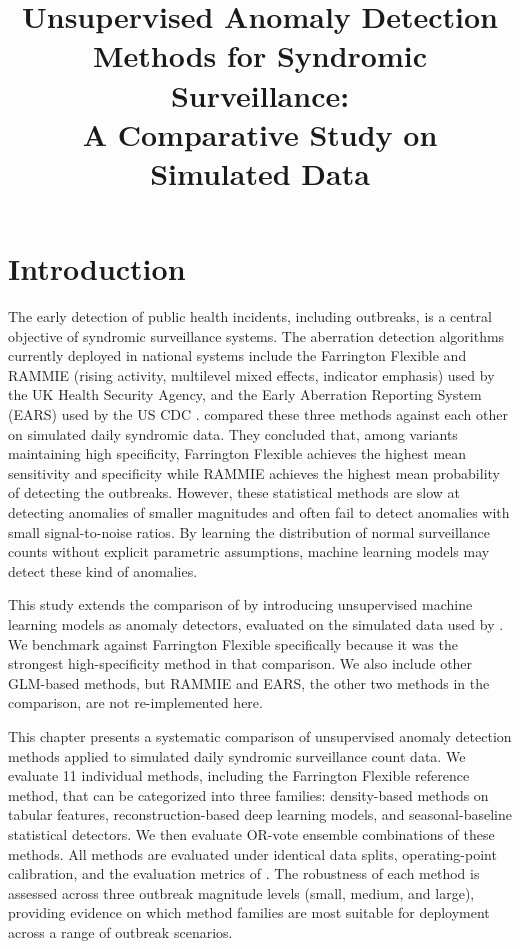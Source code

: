 \documentclass[11pt]{article}
\title{Unsupervised Anomaly Detection Methods for Syndromic Surveillance:\\
A Comparative Study on Simulated Data}
\author{}
\date{}
\begin{document}
\maketitle

\section{Introduction}

The early detection of public health incidents, including outbreaks, is a central objective of syndromic surveillance systems. The aberration detection algorithms currently deployed in national systems include the Farrington Flexible \citep{noufaily2013} and RAMMIE (rising activity, multilevel mixed effects, indicator emphasis) used by the UK Health Security Agency, and the Early Aberration Reporting System (EARS) used by the US CDC \citep{hutwagner2003, noufaily2013, morbey2015}. \citet{noufaily2019} compared these three methods against each other on simulated daily syndromic data. They concluded that, among variants maintaining high specificity, Farrington Flexible achieves the highest mean sensitivity and specificity while RAMMIE achieves the highest mean probability of detecting the outbreaks. However, these statistical methods are slow at detecting anomalies of smaller magnitudes and often fail to detect anomalies with small signal-to-noise ratios. By learning the distribution of normal surveillance counts without explicit parametric assumptions, machine learning models may detect these kind of anomalies.

This study extends the comparison of \citet{noufaily2019} by introducing unsupervised machine learning models as anomaly detectors, evaluated on the simulated data used by \citet{noufaily2019}. We benchmark against Farrington Flexible specifically because it was the strongest high-specificity method in that comparison. We also include other GLM-based methods, but RAMMIE and EARS, the other two methods in the \citet{noufaily2019} comparison, are not re-implemented here.

This chapter presents a systematic comparison of unsupervised anomaly detection methods applied to simulated daily syndromic surveillance count data. We evaluate 11 individual methods, including the Farrington Flexible reference method, that can be categorized into three families: density-based methods on tabular features, reconstruction-based deep learning models, and seasonal-baseline statistical detectors. We then evaluate OR-vote ensemble combinations of these methods. All methods are evaluated under identical data splits, operating-point calibration, and the evaluation metrics of \citet{noufaily2019}. The robustness of each method is assessed across three outbreak magnitude levels (small, medium, and large), providing evidence on which method families are most suitable for deployment across a range of outbreak scenarios.
\end{document}
